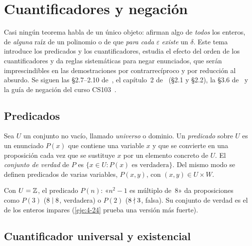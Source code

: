 \chapter{Cuantificadores y negación}
\label{tema:2}

Casi ningún teorema habla de un único objeto: afirman algo de \emph{todos} los enteros, de \emph{alguna} raíz de un polinomio o de que \emph{para cada} $\varepsilon$ \emph{existe} un $\delta$. Este tema introduce los predicados y los cuantificadores, estudia el efecto del orden de los cuantificadores y da reglas sistemáticas para negar enunciados, que serán imprescindibles en las demostraciones por contrarrecíproco y por reducción al absurdo. Se siguen las §2.7–2.10 de~\cite{hammack}, el capítulo~2 de~\cite{velleman} (§2.1 y §2.2), la §3.6 de~\cite{mcs} y la guía de negación del curso CS103~\cite{cs103}.

\section{Predicados}

\begin{definicion}[Predicado]\label{def:predicado}
Sea $U$ un conjunto no vacío, llamado \emph{universo} o dominio. Un \emph{predicado} sobre $U$ es un enunciado $P(x)$ que contiene una variable $x$ y que se convierte en una proposición cada vez que se sustituye $x$ por un elemento concreto de $U$. El \emph{conjunto de verdad} de $P$ es $\{x\in U: P(x)\text{ es verdadera}\}$. Del mismo modo se definen predicados de varias variables, $P(x,y)$, con $(x,y)\in U\times W$.
\end{definicion}

\begin{ejemplo}
Con $U=\mathbb{Z}$, el predicado $P(n)$: «$n^{2}-1$ es múltiplo de~8» da proposiciones como $P(3)$ ($8\mid 8$, verdadera) o $P(2)$ ($8\nmid 3$, falsa). Su conjunto de verdad es el de los enteros impares (\cref{eje:4-24} prueba una versión más fuerte).
\end{ejemplo}

\section{Cuantificador universal y existencial}

